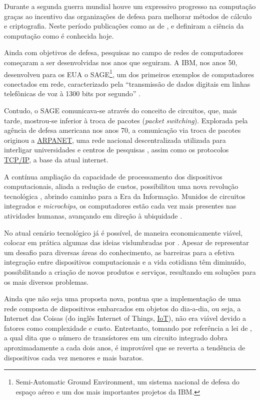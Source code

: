 \documentclass[twoside,english,brazilian]{UNISINOSmonografia}
\begin{document}
	Durante a segunda guerra mundial houve um expressivo progresso na 
	computação graças ao incentivo das organizações de defesa para melhorar 
	métodos de cálculo e criptografia. Neste período publicações como as de 
	,  e 
	 definiram a ciência da computação como é 
	conhecida hoje.

	Ainda com objetivos de defesa, pesquisas no campo de redes de computadores 
	começaram a ser desenvolvidas nos anos que seguiram. A IBM, nos anos 50,
	desenvolveu para os EUA o SAGE\footnote{Semi-Automatic Ground Environment, 
	um sistema nacional de defesa do espaço aéreo e um dos mais importantes 
	projetos da IBM. 
	}, 
	um dos primeiros exemplos de computadores conectados em rede, 
	caracterizado pela ``transmissão de dados digitais em linhas telefônicas 
	de voz à 1300 bits por segundo'' \cite[p.~348]{IBMSAGE1983}.

	Contudo, o SAGE comunicava-se através do conceito de circuitos, que, mais 
	tarde, mostrou-se inferior à troca de pacotes (\textit{packet switching}). 
	Explorada pela agência de defesa americana nos anos 70, a comunicação via 
	troca de pacotes originou a \hyperref[siglas]{ARPANET}, 
	uma rede nacional descentralizada 
	utilizada para interligar universidades e centros de pesquisas 
	\cite{ARPANET1964}, assim como os protocolos \hyperref[siglas]{TCP/IP}, 
	a base da atual internet.

	A contínua ampliação da capacidade de processamento dos dispositivos 
	computacionais, aliada a redução de custos, possibilitou uma nova 
	revolução tecnológica \cite{Atzori2010b}, abrindo caminho para a Era da 
	Informação.
	Munidos de circuitos integrados e \textit{microchips}, os computadores 
	estão cada vez mais presentes nas atividades humanas, avançando em direção 
	à ubiquidade \cite{Kaku2007}.
	
	No atual cenário tecnológico já é possível, de maneira economicamente 
	viável, colocar em prática algumas das ideias vislumbradas por 
	. 
	Apesar de representar um desafio para diversas áreas do conhecimento, as 
	barreiras para a efetiva integração entre dispositivos computacionais e a 
	vida cotidiana têm diminuído, possibilitando a criação de novos produtos e 
	serviços, resultando em soluções para os mais diversos problemas.
	
	Ainda que não seja uma proposta nova,  pontua que a 
	implementação de uma rede composta de dispositivos embarcados em objetos 
	do dia-a-dia, ou seja, a Internet das Coisas 
	(do inglês Internet of Things, \hyperref[siglas]{IoT}), 
	não era viável devido a fatores como complexidade e custo. 
	Entretanto, tomando por referência a lei de , a qual 
	dita que o número de transístores em um circuito integrado dobra 
	aproximadamente a cada dois anos, é improvável que se reverta a tendência 
	de dispositivos cada vez menores e mais baratos.
	
\end{document}
